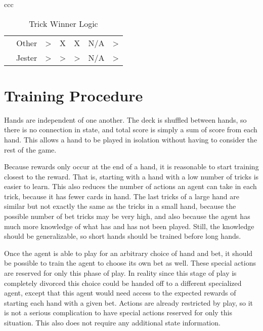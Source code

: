 \documentclass[10pt]{article} %
\begin{document}
\begin{table}[h!]
\begin{tabular}{ccc}
\begin{tabular}{rrccccc}
                          & \multicolumn{1}{r|}{Other}  & \multicolumn{1}{c|}{\textgreater{}} & \multicolumn{1}{c|}{X}              & \multicolumn{1}{c|}{X}              & \multicolumn{1}{c|}{N/A} & \multicolumn{1}{c|}{\textgreater{}} \\ \cline{3-7} 
                          & \multicolumn{1}{r|}{Jester} & \multicolumn{1}{c|}{\textgreater{}} & \multicolumn{1}{c|}{\textgreater{}} & \multicolumn{1}{c|}{\textgreater{}} & \multicolumn{1}{c|}{N/A} & \multicolumn{1}{c|}{\textgreater{}} \\ \cline{3-7} 
\end{tabular}
\end{tabular}
\caption{Trick Winner Logic}
\label{tab:trickwinner}
\end{table}

\section{Training Procedure}

Hands are independent of one another. The deck is shuffled between hands, so there is no connection in state, and total score is simply a sum of score from each hand. This allows a hand to be played in isolation without having to consider the rest of the game.

Because rewards only occur at the end of a hand, it is reasonable to start training closest to the reward. That is, starting with a hand with a low number of tricks is easier to learn. This also reduces the number of actions an agent can take in each trick, because it has fewer cards in hand. The last tricks of a large hand are similar but not exactly the same as the tricks in a small hand, because the possible number of bet tricks may be very high, and also because the agent has much more knowledge of what has and has not been played. Still, the knowledge should be generalizable, so short hands should be trained before long hands.

Once the agent is able to play for an arbitrary choice of hand and bet, it should be possible to train the agent to choose its own bet as well. These special actions are reserved for only this phase of play. In reality since this stage of play is completely divorced this choice could be handed off to a different specialized agent, except that this agent would need access to the expected rewards of starting each hand with a given bet. Actions are already restricted by play, so it is not a serious complication to have special actions reserved for only this situation. This also does not require any additional state information.
\end{document}
